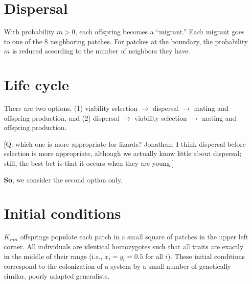 \documentclass{article}
\begin{document}
\section{Dispersal}


With probability $m>0$, each offspring becomes a ``migrant.''
Each migrant goes to one of the 8 neighboring patches.
For patches at the boundary, the probability $m$ is reduced according 
to the number of neighbors they have.


\section{Life cycle}

There are two options. (1) viability selection $\rightarrow$ dispersal
$\rightarrow$ mating and offspring production, and (2) dispersal
$\rightarrow$ viability selection $\rightarrow$ mating and offspring production.

{\footnotesize [Q: which one is more appropriate for lizards? Jonathan:
I think dispersal before selection is more appropriate, although we actually know little about dispersal; still, the best bet is that it occurs when they are young.]}

{\bf So}, we consider the second option only.


\section{Initial conditions}

$K_{init}$ offsprings populate each patch in a small square of patches in the upper left corner.
All individuals are identical homozygotes such that all traits are exactly in the
middle of their range (i.e., $x_i=y_i=0.5$ for all $i$).
These initial conditions correspond to the colonization of a system by a small number of
genetically similar, poorly adapted generalists.
\end{document}
